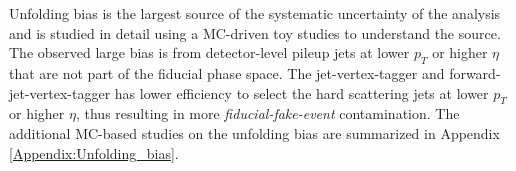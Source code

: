 Unfolding bias is the largest source of the systematic uncertainty of the analysis and is studied in detail using a MC-driven toy studies to understand the source. The observed large bias is from detector-level pileup jets at lower $p_{T}$ or higher $\eta$ that are not part of the fiducial phase space. The jet-vertex-tagger and forward-jet-vertex-tagger has lower efficiency to select the hard scattering jets at lower $p_{T}$ or higher $\eta$, thus resulting in more \textit{fiducial-fake-event} contamination. The additional MC-based studies on the unfolding bias are summarized in Appendix \ref{Appendix:Unfolding_bias}. 
